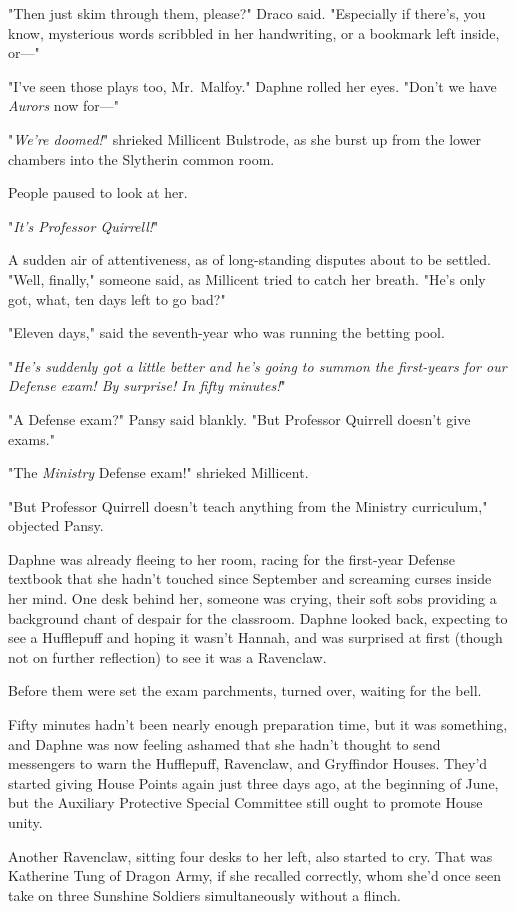 "Then just skim through them, please?" Draco said. "Especially if there's, you
know, mysterious words scribbled in her handwriting, or a bookmark left inside,
or---"

"I've seen those plays too, Mr.~Malfoy." Daphne rolled her eyes. "Don't we have
\emph{Aurors} now for---"

"\emph{We're doomed!}" shrieked Millicent Bulstrode, as she burst up from the
lower chambers into the Slytherin common room.

People paused to look at her.

"\emph{It's Professor Quirrell!}"

A sudden air of attentiveness, as of long-standing disputes about to be
settled. "Well, finally," someone said, as Millicent tried to catch her breath.
"He's only got, what, ten days left to go bad?"

"Eleven days," said the seventh-year who was running the betting pool.

"\emph{He's suddenly got a little better and he's going to summon the
first-years for our Defense exam! By surprise! In fifty minutes!}"

"A Defense exam?" Pansy said blankly. "But Professor Quirrell doesn't give
exams."

"The \emph{Ministry} Defense exam!" shrieked Millicent.

"But Professor Quirrell doesn't teach anything from the Ministry curriculum,"
objected Pansy.

Daphne was already fleeing to her room, racing for the first-year Defense
textbook that she hadn't touched since September and screaming curses inside
her mind.
\later
One desk behind her, someone was crying, their soft sobs providing a
background chant of despair for the classroom. Daphne looked back, expecting to
see a Hufflepuff and hoping it wasn't Hannah, and was surprised at first
(though not on further reflection) to see it was a Ravenclaw.

Before them were set the exam parchments, turned over, waiting for the bell.

Fifty minutes hadn't been nearly enough preparation time, but it was something,
and Daphne was now feeling ashamed that she hadn't thought to send messengers
to warn the Hufflepuff, Ravenclaw, and Gryffindor Houses. They'd started giving
House Points again just three days ago, at the beginning of June, but the
Auxiliary Protective Special Committee still ought to promote House unity.

Another Ravenclaw, sitting four desks to her left, also started to cry. That
was Katherine Tung of Dragon Army, if she recalled correctly, whom she'd once
seen take on three Sunshine Soldiers simultaneously without a flinch.

